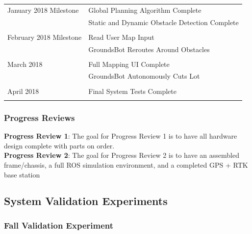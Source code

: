 \documentclass[12pt]{extarticle}
\begin{document}
\begin{table}[H]
\begin{tabular}{ll}
January 2018 Milestone 

    &Global Planning Algorithm Complete          \\
    &Static and Dynamic Obstacle Detection Complete\\
                                               \\
February 2018 Milestone 
  
    &Read User Map Input                        \\
    &GroundsBot Reroutes Around Obstacles       \\
                                              \\
March 2018 
  
    &Full Mapping UI Complete                   \\
    &GroundsBot Autonomously Cuts Lot           \\
                                              \\
April 2018 

    &Final System Tests Complete                \\                                            \\
\end{tabular}

\end{table}

\subsubsection{Progress Reviews}
\noindent
\textbf{Progress Review 1}: The goal for Progress Review 1 is to have all hardware design complete with parts on order. \\
\textbf{Progress Review 2}: The goal for Progress Review 2 is to have an assembled frame/chassis, a full ROS simulation environment, and a completed GPS + RTK base station\\

\subsection{System Validation Experiments}
\subsubsection{Fall Validation Experiment}
\end{document}
